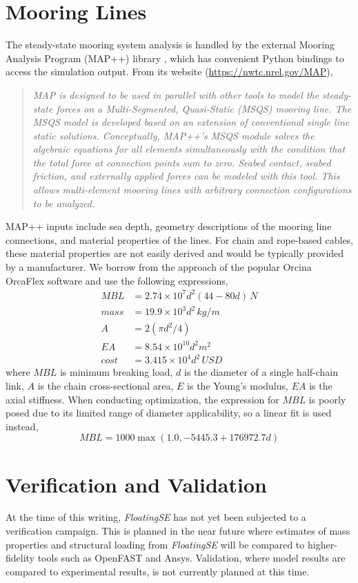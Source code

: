 \section{Mooring Lines}
The steady-state mooring system analysis is handled by the external Mooring Analysis
Program (MAP++) library \citep{MAP}, which has convenient Python bindings
to access the simulation output.  From its website
(\url{https://nwtc.nrel.gov/MAP}),
\begin{quote}
  \textit{MAP is designed to be used in parallel with other tools to model the
  steady-state forces on a Multi-Segmented, Quasi-Static (MSQS) mooring
  line. The MSQS model is developed based on an extension of
  conventional single line static solutions. Conceptually, MAP++'s MSQS
  module solves the algebraic equations for all elements simultaneously
  with the condition that the total force at connection points sum to
  zero. Seabed contact, seabed friction, and externally applied forces
  can be modeled with this tool. This allows multi-element mooring lines
  with arbitrary connection configurations to be analyzed.}
\end{quote}

MAP++ inputs include sea depth, geometry descriptions of the mooring
line connections, and material properties of the lines.  For chain and
rope-based cables, these material properties are not easily derived and
would be typically provided by a manufacturer.  We borrow from the
approach of the popular Orcina OrcaFlex software \citep{orca} and use
the following expressions,
\begin{align*}
MBL &= 2.74\times 10^7  d^2 \left(44 - 80d\right) \,\unit{N} \\
mass &= 19.9\times 10^3 d^2 \,\unit{kg/m}\\
A &= 2\left(\pi d^2 / 4 \right)\\
EA &= 8.54\times 10^{10} d^2\unit{m^2}\\
cost &= 3.415\times 10^4 d^2 \,\unit{USD}
\end{align*}
where $MBL$ is minimum breaking load, $d$ is the diameter of a single
half-chain link, $A$ is the chain cross-sectional area, $E$ is the
Young's modulus, $EA$ is the axial stiffness.  When conducting
optimization, the expression for $MBL$ is poorly posed due to its limited
range of diameter applicability, so a linear fit is used instead,
\[
MBL = 1000 \max\left(1.0, -5445.3 + 176972.7 d\right)
\]  

\section{Verification and Validation}
At the time of this writing, \textit{FloatingSE} has not yet been
subjected to a verification campaign.  This is planned in the near
future where estimates of mass properties and structural loading from
\textit{FloatingSE} will be compared to higher-fidelity tools such as
OpenFAST and Ansys.  Validation, where model results are compared to
experimental results, is not currently planned at this time.
